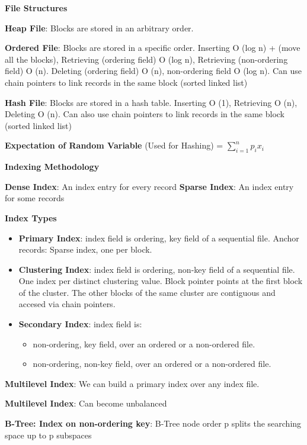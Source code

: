 \documentclass{article}
\begin{document}
\noindent \textbf{File Structures}

\noindent \textbf{Heap File}: Blocks are stored in an arbitrary order. 

\noindent \textbf{Ordered File}: Blocks are stored in a specific order. 
Inserting O (log n) + (move all the blocks), 
Retrieving (ordering field) O (log n), Retrieving (non-ordering field) O (n). 
Deleting (ordering field) O (n), non-ordering field O (log n).
Can use chain pointers to link records in the same block (sorted linked list)

\noindent \textbf{Hash File}: Blocks are stored in a hash table. Inserting O (1), Retrieving O (n), Deleting O (n).
Can also use chain pointers to link records in the same block (sorted linked list)


\noindent \textbf{Expectation of Random Variable} (Used for Hashing) = $\sum_{i=1}^{n} p_i x_i$


\noindent \textbf{Indexing Methodology}

\noindent \textbf{Dense Index}: An index entry for every record
\textbf{Sparse Index}: An index entry for some records

\noindent \textbf{Index Types}
\begin{itemize}
    \item \textbf{Primary Index}: index field is ordering, key field of a sequential file.
    Anchor records: Sparse index, one per block.
    \item \textbf{Clustering Index}: index field is ordering, non-key field of a sequential file.
    One index per distinct clustering value. Block pointer points at the first block of the cluster.
    The other blocks of the same cluster are contiguous and accesed via chain pointers.
    \item \textbf{Secondary Index}: index field is:
    \begin{itemize}
        \item non-ordering, key field, over an ordered or a non-ordered file.
        \item non-ordering, non-key field, over an ordered or a non-ordered file.
    \end{itemize}
\end{itemize}

\noindent \textbf{Multilevel Index}: We can build a primary index over any index file.

\noindent \textbf{Multilevel Index}: Can become unbalanced

\noindent \textbf{B-Tree: Index on non-ordering key}: B-Tree node order p splits the searching space up to p subspaces
\end{document}
